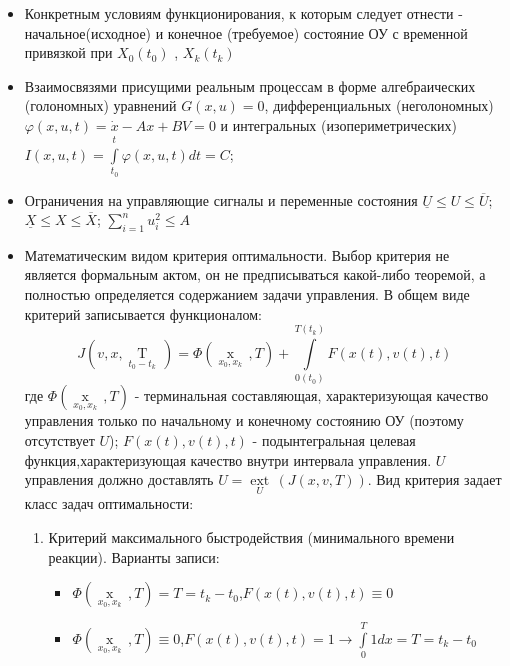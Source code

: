 \documentclass[preprint,russian,a5paper,10pt,twoside]{ncc}
\begin{document}
\begin{itemize}
\item Конкретным условиям функционирования, к которым следует отнести - начальное(исходное) и конечное (требуемое) состояние ОУ с временной привязкой при $X_{0}\left ( t_{0} \right )$ , $X_{k}\left ( t_{k} \right )$ 
\item Взаимосвязями присущими реальным процессам в форме алгебраических (голономных) уравнений $G\left( x,u \right)=0$, дифференциальных (неголономных) $\varphi \left( x,u,t \right)=\dot{x}-Ax+BV=0$ и интегральных (изопериметрических) $I\left( x,u,t \right)=\int\limits_{{{t}_{0}}}^{{{t}_{}}}{\varphi \left( x,u,t \right)dt=C}$;
\item Ограничения на управляющие сигналы и переменные состояния $\underline{U}\le U\le \overline{U}$; $\underline{X}\le X\le \overline{X}$; $\sum\limits_{i=1}^{n}{u_{i}^{2}}\le A$
\item Математическим видом критерия оптимальности. Выбор критерия не является формальным актом, он не предписываться какой-либо теоремой, а полностью определяется содержанием задачи управления. В общем виде критерий записывается функционалом: 
\[J\left( v,x,\underset{{{t}_{0}}-{{t}_{k}}}{\mathop{T}}\, \right)=\Phi \left( \underset{{{x}_{0}},{{x}_{k}}}{\mathop{x\left( T \right)}}\,,T \right)+\int\limits_{0\left( {{t}_{0}} \right)}^{T\left( {{t}_{k}} \right)}{F\left( x\left( t \right),v\left( t \right),t \right)}\]где $\Phi \left( \underset{{{x}_{0}},{{x}_{k}}}{\mathop{x\left( T \right)}}\,,T \right)$ - терминальная составляющая, характеризующая качество управления только по начальному и конечному состоянию ОУ (поэтому отсутствует $U$); $F\left( x\left( t \right),v\left( t \right),t \right)$ - подынтегральная целевая функция,характеризующая качество внутри интервала управления. $U$ управления должно доставлять $U=\underset{U}{\mathop{ext}}\,\left( J\left( x,v,T \right) \right)$. Вид критерия задает класс задач оптимальности: 
\begin{enumerate}
\item Критерий максимального быстродействия (минимального времени реакции). Варианты записи:
\begin{itemize}
\item $\Phi \left( \underset{{{x}_{0}},{{x}_{k}}}{\mathop{x\left( T \right)}}\,,T \right)=T={{t}_{k}}-{{t}_{0}}$,$F\left( x\left( t \right),v\left( t \right),t \right)\equiv 0$  
\item $\Phi \left( \underset{{{x}_{0}},{{x}_{k}}}{\mathop{x\left( T \right)}}\,,T \right)\equiv 0$,$F\left( x\left( t \right),v\left( t \right),t \right)=1\to \int\limits_{0}^{T}{1dx}=T={{t}_{k}}-{{t}_{0}}$

\end{itemize}
\end{enumerate}
\end{itemize}
\end{document}
